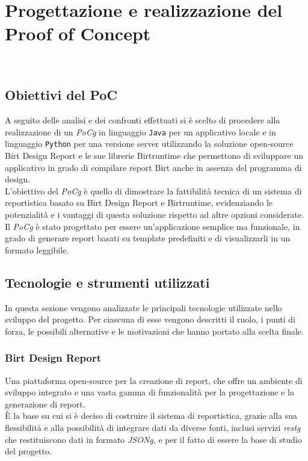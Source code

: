 \chapter{Progettazione e realizzazione del Proof of Concept}
\label{cap:progettazione-codifica}

\\

\section{Obiettivi del PoC}
A seguito delle analisi e dei confronti effettuati si è scelto di procedere alla realizzazione di un \emph{\gls{PoCg}} in linguaggio \texttt{Java} per un applicativo locale e in linguaggio \texttt{Python} per una versione server utilizzando la soluzione open-source Birt Design Report e le sue librerie Birtruntime che permettono di sviluppare un applicativo in grado di compilare report Birt anche in assenza del programma di design.\\
L'obiettivo del \emph{\gls{PoCg}} è quello di dimostrare la fattibilità tecnica di un sistema di reportistica basato su Birt Design Report e Birtruntime, evidenziando le potenzialità e i vantaggi di questa soluzione rispetto ad altre opzioni considerate.\\
Il \emph{\gls{PoCg}} è stato progettato per essere un'applicazione semplice ma funzionale, in grado di generare report basati su template predefiniti e di visualizzarli in un formato leggibile.\\

\section{Tecnologie e strumenti utilizzati}
\label{sec:tecnologie-strumenti-utilizzati}
In questa sezione vengono analizzate le principali tecnologie utilizzate nello sviluppo del progetto. Per ciascuna di esse vengono descritti il ruolo, i punti di forza, le possibili alternative e le motivazioni che hanno portato alla scelta finale.
    
    \subsection{Birt Design Report}
    \label{subsec:birt-design-report}
    Una piattaforma open-source per la creazione di report, che offre un ambiente di sviluppo integrato e una vasta gamma di funzionalità per la progettazione e la generazione di report.\\
    È la base su cui si è deciso di costruire il sistema di reportistica, grazie alla sua flessibilità e alla possibilità di integrare dati da diverse fonti, inclusi servizi \emph{\gls{restg}} che restituiscono dati in formato \emph{\gls{JSONg}}, e per il fatto di essere la base di studio del progetto.\\
